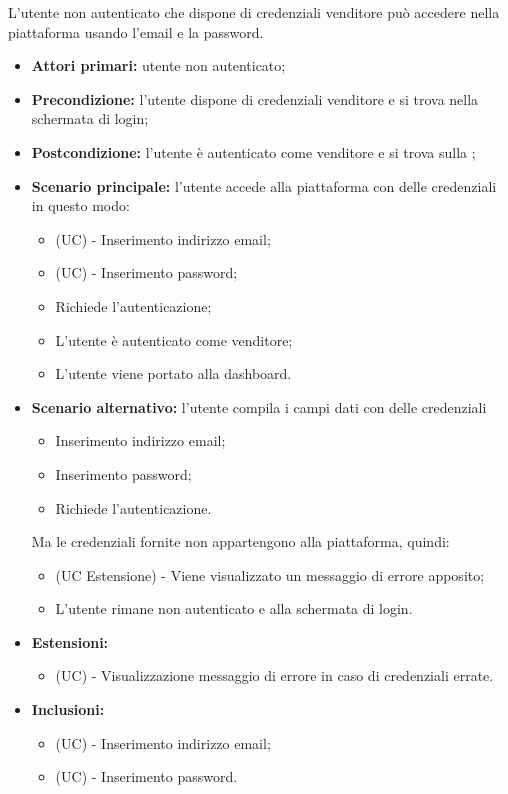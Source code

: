 L'utente non autenticato che dispone di credenziali venditore può accedere nella piattaforma usando l'email e la password.
\begin{itemize}
    \item \textbf{Attori primari:} utente non autenticato;
    \item \textbf{Precondizione:} l'utente dispone di credenziali venditore e si trova nella schermata di login;
    \item \textbf{Postcondizione:} l'utente è autenticato come venditore e si trova sulla ;
    \item \textbf{Scenario principale:} l'utente accede alla piattaforma con delle credenziali in questo modo:
    \begin{itemize}
        \item (UC) - Inserimento indirizzo email;
        \item (UC) - Inserimento password;
        \item Richiede l'autenticazione;
        \item L'utente è autenticato come venditore;
        \item L'utente viene portato alla dashboard.
    \end{itemize}
	\item \textbf{Scenario alternativo:} l'utente compila i campi dati con delle credenziali
	\begin{itemize}
		\item Inserimento indirizzo email;
		\item Inserimento password;
        \item Richiede l'autenticazione.
    \end{itemize}
	Ma le credenziali fornite non appartengono alla piattaforma, quindi:
	\begin{itemize}
		\item (UC Estensione) - Viene visualizzato un messaggio di errore apposito;
		\item L'utente rimane non autenticato e alla schermata di login.
	\end{itemize}
    \item \textbf{Estensioni:}
    \begin{itemize}
        \item (UC) - Visualizzazione messaggio di errore in caso di credenziali errate.
    \end{itemize}
    \item \textbf{Inclusioni:}
    \begin{itemize}
    	\item (UC) - Inserimento indirizzo email;
    	\item (UC) - Inserimento password.
    \end{itemize}
\end{itemize}

